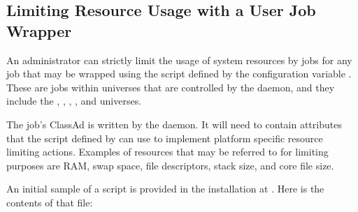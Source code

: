 \subsection{\label{sec:Resource-Limits}Limiting Resource Usage with a User Job Wrapper} 

An administrator can strictly limit the usage of system resources
by jobs for any job that may be wrapped using
the script defined by the configuration variable
.
These are jobs within universes that are controlled by the
 daemon, and they include 
the , , ,
, and  universes.

The job's ClassAd is written by the  daemon.
It will need to contain attributes that the script defined by
 can use to implement 
platform specific resource limiting actions.
Examples of resources that may be referred to for limiting purposes
are RAM, swap space, file descriptors, stack size, and core file size. 

An initial sample of a  script is provided
in the installation at
.
Here is the contents of that file:

